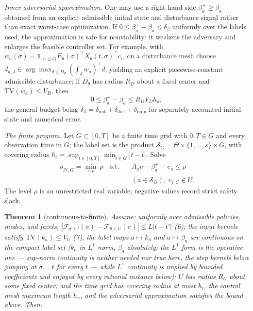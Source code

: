 \documentclass[10pt,twocolumn]{article}
\theoremstyle{plain}
\newtheorem{theorem}{Theorem}
\theoremstyle{definition}
\theoremstyle{remark}
\begin{document}
\emph{Inner adversarial approximation.} One may use a right-hand side
\(\beta_a^{+} \ge \beta_a\) obtained from an explicit admissible initial
state and disturbance signal rather than exact worst-case optimization. If
\(0 \le \beta_a^{+} - \beta_a \le \delta_\beta\) uniformly over the labels
used, the approximation is safe for nonviability: it weakens the adversary
and enlarges the feasible controller set. For example, with
\(w_a(\sigma) = \mathbf{1}_{\{\sigma \le t\}}
E_\theta(\sigma)^\top X_\theta(t,\sigma)^\top c_i\), on a disturbance mesh
choose \(d_{a,J} \in \arg\max_{d \in D_\theta} (\int_J w_a)^\top d\),
yielding an explicit piecewise-constant admissible disturbance; if
\(D_\theta\) has radius \(R_D\) about a fixed center and
\(\mathrm{TV}(w_a) \le V_D\), then
\[
0 \le \beta_a^{+} - \beta_a \le R_D V_D h_d,
\tag{4}
\]
the general budget being \(\delta_\beta = \delta_{\mathrm{init}} +
\delta_{\mathrm{dist}} + \delta_{\mathrm{num}}\) for separately accounted
initial-state and numerical error.

\emph{The finite program.} Let \(G \subset [0,T]\) be a finite time grid with \(0, T \in G\) and
every observation time in \(G\); the label set is the product
\(\mathscr{S}_G = \Theta \times \{1,\dots,s\} \times G\), with covering
radius \(h_t = \sup_{t \in [0,T]} \min_{\hat{t} \in G} |t -
\hat{t}|\). Solve
\begin{align*}
\rho_{\mathcal{H},G} = \min_{v, \rho}\ \rho
\quad \text{s.t.} \quad
& A_a v - \beta_a^{+} - \bar{e}_a \le \rho \\
& (a \in \mathscr{S}_G),
\ v_{j,C} \in U.
\tag{5}
\end{align*}
The level \(\rho\) is an unrestricted real variable; negative values record
strict safety slack.

\begin{theorem}[continuous-to-finite]\label{thm:bridge}
Assume: uniformly over admissible policies, modes, and facets,
\(|\mathcal{F}_{\theta,i,t}(\pi) - \mathcal{F}_{\theta,i,t'}(\pi)| \le
L|t - t'|\) (6); the input kernels satisfy \(\mathrm{TV}(k_a) \le V_U\) (7); the label
maps \(a \mapsto k_a\) and \(a \mapsto \beta_a\) are continuous on
the compact label set (\(k_a\) in \(L^1\) norm, \(\beta_a\)
absolutely; the \(L^1\) form is the operative one --- sup-norm continuity
is neither needed nor true here, the step kernels below jumping at
\(\sigma = t\) for every \(t\) --- while \(L^1\) continuity is implied
by bounded coefficients and enjoyed by every rational instance below);
\(U\) has radius \(R_U\) about some fixed center; and the time grid has
covering radius at most \(h_t\), the control mesh maximum length \(h_u\),
and the adversarial approximation satisfies the bound above. Then:
\end{theorem}
\end{document}
